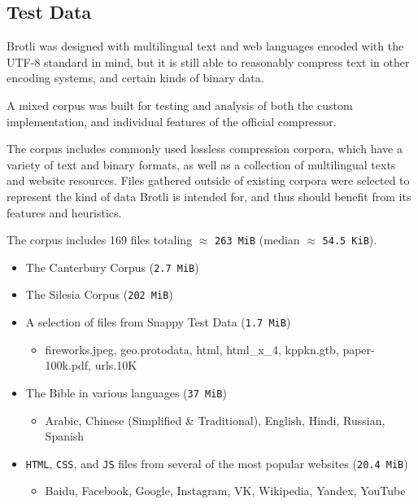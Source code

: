 \documentclass[english,master,dept460,male,cpp,cpdeclaration]{diploma}
\newif\ifSIMPLIFIED
\newcommand{\nosep}{\itemsep0em}
\begin{document}
	\fi %
	
	\subsection{Test Data}
	
	Brotli was designed with multilingual text and web languages encoded with the UTF-8 standard in mind, but it is still able to reasonably compress text in other encoding systems, and certain kinds of binary data.
	
	A mixed corpus was built for testing and analysis of both the custom implementation, and individual features of the official compressor.
	
	The corpus includes commonly used lossless compression corpora, which have a variety of text and binary formats, as well as a collection of multilingual texts and website resources. Files gathered outside of existing corpora were selected to represent the kind of data Brotli is intended for, and thus should benefit from its features and heuristics.
	
	The corpus includes 169 files totaling $\approx$ \verb|263 MiB| (median $\approx$ \verb|54.5 KiB|). 
	
	\ifSIMPLIFIED
	
	\begin{itemize} \nosep
		\item The Canterbury Corpus (\verb|2.7 MiB|)
		\item The Silesia Corpus (\verb|202 MiB|)
		\item A selection of files from Snappy Test Data (\verb|1.7 MiB|)
		\begin{itemize} \nosep
			\item fireworks.jpeg, geo.protodata, html, html\_x\_4, kppkn.gtb, paper-100k.pdf, urls.10K
		\end{itemize}
		\item The Bible in various languages (\verb|37 MiB|)
		\begin{itemize} \nosep
			\item Arabic, Chinese (Simplified \& Traditional), English, Hindi, Russian, Spanish
		\end{itemize}
		\item \verb|HTML|, \verb|CSS|, and \verb|JS| files from several of the most popular websites (\verb|20.4 MiB|)
		\begin{itemize} \nosep
			\item Baidu, Facebook, Google, Instagram, VK, Wikipedia, Yandex, YouTube
		\end{itemize}
	\end{itemize}
	
\end{document}
